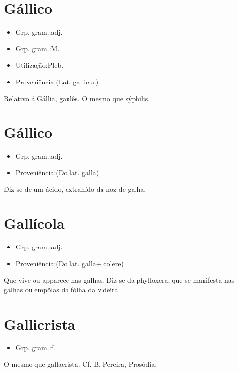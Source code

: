 \section{Gállico}
\begin{itemize}
\item {Grp. gram.:adj.}
\end{itemize}
\begin{itemize}
\item {Grp. gram.:M.}
\end{itemize}
\begin{itemize}
\item {Utilização:Pleb.}
\end{itemize}
\begin{itemize}
\item {Proveniência:(Lat. \textunderscore gallicus\textunderscore )}
\end{itemize}
Relativo á Gállia, gaulês.
O mesmo que \textunderscore sýphilis\textunderscore .
\section{Gállico}
\begin{itemize}
\item {Grp. gram.:adj.}
\end{itemize}
\begin{itemize}
\item {Proveniência:(Do lat. \textunderscore galla\textunderscore )}
\end{itemize}
Diz-se de um ácido, extrahído da noz de galha.
\section{Gallícola}
\begin{itemize}
\item {Grp. gram.:adj.}
\end{itemize}
\begin{itemize}
\item {Proveniência:(Do lat. \textunderscore galla\textunderscore  + \textunderscore colere\textunderscore )}
\end{itemize}
Que vive ou apparece nas galhas.
Diz-se da phylloxera, que se manifesta nas galhas ou empôlas da fôlha da videira.
\section{Gallicrista}
\begin{itemize}
\item {Grp. gram.:f.}
\end{itemize}
O mesmo que \textunderscore gallacrista\textunderscore . Cf. B. Pereira, \textunderscore Prosódia\textunderscore .
